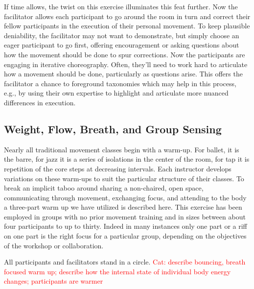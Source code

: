 \documentclass[arts,article,submit,moreauthors,pdftex,10pt,a4paper]{mdpi}
\begin{document}
If time allows, the twist on this exercise illuminates this feat further.  Now the facilitator allows each participant to go around the room in turn and correct their fellow participants in the execution of their personal movement.  To keep plausible deniability, the facilitator may not want to demonstrate, but simply choose an eager participant to go first, offering encouragement or asking questions about how the movement should be done to spur corrections.  Now the participants are engaging in iterative choreography.  Often, they'll need to work hard to articulate how a movement should be done, particularly as questions arise.  This offers the facilitator a chance to foreground taxonomies which may help in this process, e.g., by using their own expertise to highlight  and articulate more nuanced differences in execution.  

\subsection{Weight, Flow, Breath, and Group Sensing}


Nearly all traditional movement classes begin with a warm-up.  For ballet, it is the barre, for jazz it is a series of isolations in the center of the room, for tap it is repetition of the core steps at decreasing intervals.  Each instructor develops variations on these warm-ups to suit the particular structure of their classes.  To break an implicit taboo around sharing a non-chaired, open space, communicating through movement, exchanging focus, and attending to the body a three-part warm up we have utilized is described here.  This exercise has been employed in groups with no prior movement training and in sizes between about four participants to up to thirty.  Indeed in many instances only one part or a riff on one part is the right focus for a particular group, depending on the objectives of the workshop or collaboration.

All participants and facilitators stand in a circle.  \textcolor{red}{Cat: describe bouncing, breath focused warm up; describe how the internal state of individual body energy changes; participants are warmer}  
\end{document}
